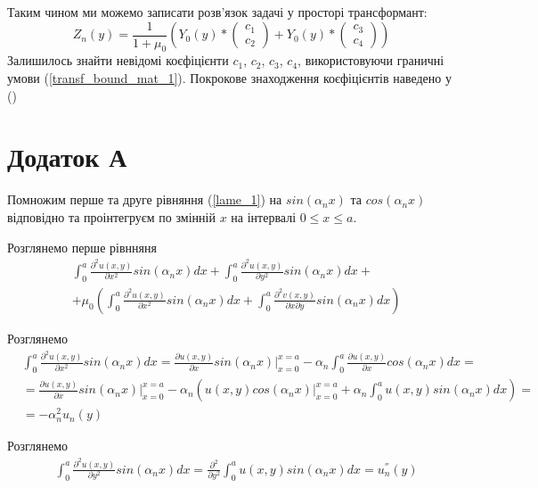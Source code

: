 \documentclass[a4paper,14pt]{extarticle}
\numberwithin{equation}{section}
\begin{document}
Таким чином ми можемо записати розв'язок задачі у просторі трансформант:
\begin{equation}
    Z_n(y) = \frac{1}{1 + \mu_0} \left( Y_0(y) * \begin{pmatrix} c_1 \\ c_2 \end{pmatrix} +  Y_0(y) * \begin{pmatrix} c_3 \\ c_4 \end{pmatrix}  \right)
\end{equation}
Залишилось знайти невідомі коєфіцієнти $c_1$, $c_2$, $c_3$, $c_4$, використовуючи граничні умови (\ref{transf_bound_mat_1}).
Покрокове знаходження коєфіцієнтів наведено у ()

\section{Додаток А}\label{ap_A_1}
Помножим перше та друге рівняння (\ref{lame_1}) на $sin(\alpha_n x)$ та $cos(\alpha_n x)$ відповідно та проінтегруєм по змінній $x$ на інтервалі $0 \le x \le a$.

Розглянемо перше рівнняня
\begin{align*}
    &\int_{0}^{a} \frac{\partial^2 u(x,y)}{\partial x^2} sin(\alpha_n x)dx + \int_{0}^{a} \frac{\partial^2 u(x,y)}{\partial y^2} sin(\alpha_n x)dx + \\ 
    & + \mu_0 \left( \int_{0}^{a} \frac{\partial^2 u(x,y)}{\partial x^2} sin(\alpha_n x)dx +  \int_{0}^{a} \frac{\partial^2 v(x,y)}{\partial x \partial y} sin(\alpha_n x) dx\right)
\end{align*}

Розглянемо
\begin{align*}
    &\int_{0}^{a} \frac{\partial^2 u(x,y)}{\partial x^2} sin(\alpha_n x)dx = \frac{\partial u(x,y)}{\partial x} sin(\alpha_n x) |_{x=0}^{x=a} - \alpha_n \int_{0}^{a} \frac{\partial u(x,y)}{\partial x} cos(\alpha_n x)dx = \\
    &= \frac{\partial u(x,y)}{\partial x} sin(\alpha_n x) |_{x=0}^{x=a} - \alpha_n \left( u(x,y) cos(\alpha_n x) |_{x=0}^{x=a} + \alpha_n \int_{0}^{a} u(x,y) sin(\alpha_n x) dx \right) = \\
    &= -\alpha_n^2 u_n(y)
\end{align*}

Розглянемо
\begin{align*}
    &\int_{0}^{a} \frac{\partial^2 u(x,y)}{\partial y^2} sin(\alpha_n x)dx = \frac{\partial^2}{\partial y^2} \int_{0}^{a} u(x,y) sin(\alpha_n x)dx = u_n^{''}(y)
\end{align*}
\end{document}
